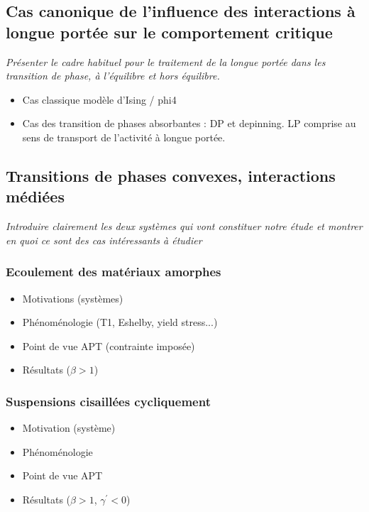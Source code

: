 \documentclass[10pt,a4paper]{article}
\begin{document}
\subsection{Cas canonique de l'influence des interactions à longue portée sur le comportement critique}

\textit{Présenter le cadre habituel pour le traitement de la longue portée dans les transition de phase, à l'équilibre et hors équilibre.}

\begin{itemize}
	\item Cas classique modèle d'Ising / phi4
	\item Cas des transition de phases absorbantes : DP et depinning. LP comprise au sens de transport de l'activité à longue portée.
\end{itemize}

\subsection{Transitions de phases convexes, interactions médiées}

\textit{Introduire clairement les deux systèmes qui vont constituer notre étude et montrer en quoi ce sont des cas intéressants à étudier}

\subsubsection{Ecoulement des matériaux amorphes}

\begin{itemize}
	\item Motivations (systèmes)
	\item Phénoménologie (T1, Eshelby, yield stress...)
	\item Point de vue APT (contrainte imposée)
	\item Résultats ($\beta>1$)
\end{itemize}

\subsubsection{Suspensions cisaillées cycliquement}

\begin{itemize}
	\item Motivation (système)
	\item Phénoménologie
	\item Point de vue APT
	\item Résultats ($\beta>1$, $\gamma^\prime<0$)
\end{itemize}
\end{document}

